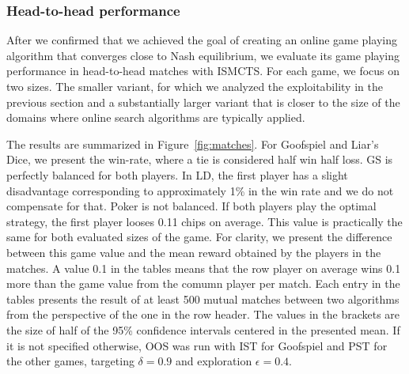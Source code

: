 \documentclass{aamas2015}
\newcounter{mlNoteCounter}
\newcommand{\mlnote}[1]{{\scriptsize \color{darkgreen} $\blacksquare$ \refstepcounter{mlNoteCounter}\textsf{[ML]$_{\arabic{mlNoteCounter}}$:{#1}}}}
\renewcommand{\mlnote}[1]{}
\begin{document}

\subsubsection{Head-to-head performance}

After we confirmed that we achieved the goal of creating an online game playing algorithm that converges close to Nash equilibrium, we evaluate its game playing performance in head-to-head matches with ISMCTS.
For each game, we focus on two sizes. The smaller variant, for which we analyzed the exploitability in the previous section and a substantially larger variant that is closer to the size of the domains where online search algorithms are typically applied. 



The results are summarized in Figure~\ref{fig:matches}.
For Goofspiel and Liar's Dice, we present the win-rate, where a tie is considered half win half loss. GS is perfectly balanced for both players. In LD, the first player has a slight disadvantage corresponding to approximately 1\% \mlnote{...?} in the win rate and we do not compensate for that.
Poker is not balanced. If both players play the optimal strategy, the first player looses 0.11 chips on average.
This value is practically the same for both evaluated sizes of the game.
For clarity, we present the difference between this game value and the mean reward obtained by the players in the matches. A value 0.1 in the tables means that the row player on average wins 0.1 more than the game value from the comumn player per match.
Each entry in the tables presents the result of at least 500 mutual matches between two algorithms from the perspective of the one in the row header. The values in the brackets are the size of half of the 95\% confidence intervals centered in the presented mean. If it is not specified otherwise, OOS was run with IST for Goofspiel and PST for the other games, targeting $\delta=0.9$ and exploration $\epsilon=0.4$.
\end{document}

